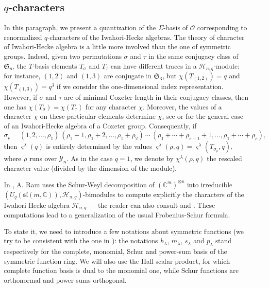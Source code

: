 \documentclass[10pt]{amsart}
\theoremstyle{remark}
\newcommand{\C}{\mathbb{C}}
\newcommand{\IH}{\mathscr{H}}
\newcommand{\sym}{\mathfrak{S}}
\newcommand{\young}{\mathscr{Y}}
\newcommand{\obs}{\mathscr{O}}
\begin{document}
\subsection{$q$-characters}

In this paragraph, we present a quantization of the $\varSigma$-basis of $\obs$
corresponding to renormalized $q$-characters of the Iwahori-Hecke algebras.
The theory of character of Iwahori-Hecke algebra is a little more involved
than the one of symmetric groups.
Indeed, given two permutations $\sigma$ and $\tau$ in the same conjugacy class of $\sym_n$,
the $T$-basis elements $T_\sigma$ and $T_\tau$ can have different traces in a $\IH_{n,q}$-module:
for instance, $(1,2)$ and $(1,3)$ are conjugate in $\sym_3$, but $\chi(T_{(1,2)})=q$
and $\chi(T_{(1,3)})=q^3$ if we consider the one-dimensional index representation.
However, if $\sigma$ and $\tau$ are of minimal Coxeter length in their conjugacy classes,
then one has $\chi(T_{\sigma})=\chi(T_{\tau})$ for any character $\chi$.
Moreover, the values of a character $\chi$ on these particular elements determine $\chi$,
see  \cite[Propositions 5.1 and 5.2]{Ram91} or \cite[\S8.2]{GP00} for the general case
of an Iwahori-Hecke algebra of a Coxeter group. Consequently, if
$$\sigma_\rho=(1,2,\ldots,\rho_1)\,(\rho_1+1,\rho_1+2,\ldots,\rho_1+\rho_2)\,
\cdots\,(\rho_1+\cdots+\rho_{r-1}+1,\ldots,\rho_1+\cdots+\rho_r),$$
then $\varsigma^{\lambda}(q)$ is entirely determined by the values
$\varsigma^{\lambda}(\rho,q)=\varsigma^{\lambda}(T_{\sigma_{\rho}},q)$, 
where $\rho$ runs over $\young_{n}$.
As in the case $q=1$, we denote by $\chi^\lambda(\rho,q)$ the rescaled
character value (divided by the dimension of the module).\bigskip

In \cite{Ram91}, A. Ram uses the Schur-Weyl decomposition of $(\C^m)^{\otimes n}$
into irreducible $(U_q(\mathfrak{sl}(m,\C)),\IH_{n,q})$-bimodules
to compute explicitly the characters of the Iwahori-Hecke algebra $\IH_{n,q}$ 
--- the reader can also consult \cite{RRW96} and \cite{RR97}.
These computations lead to a generalization of the usual Frobenius-Schur formula. \bigskip


To state it, we need to introduce a few notations about symmetric functions (we try
to be consistent with the one in \cite{Mac95}): the notations $h_\lambda$, $m_\lambda$,
$s_\lambda$ and $p_\lambda$ stand respectively for the complete, monomial, Schur and
power-sum basis of the symmetric function ring. We will also use the Hall scalar product,
for which complete function basis is dual to the monomial one, while Schur functions are
orthonormal and power sums orthogonal.\bigskip
\end{document}
